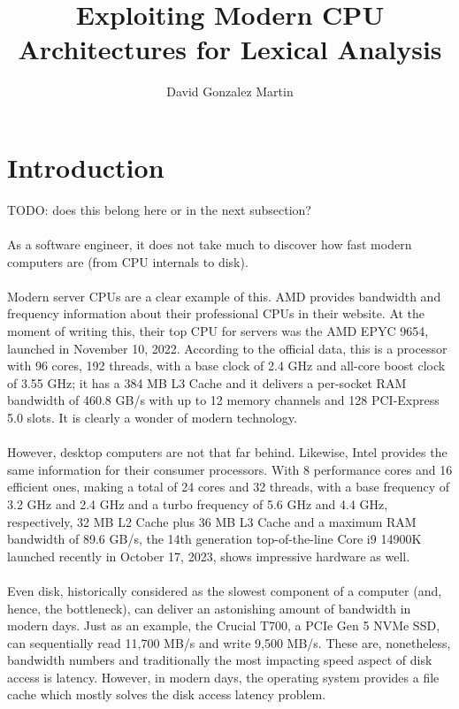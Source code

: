 \documentclass[12pt]{article}
\title{\vspace{-2.5cm}\textbf{Exploiting Modern CPU Architectures for Lexical Analysis}}
\author{David Gonzalez Martin}
\date{\vspace{-5ex}}
\begin{document}
	\maketitle{\vspace{-1.5cm}}
	\newpage
	\tableofcontents
	\newpage
	\section{Introduction}
	TODO: does this belong here or in the next subsection?
	
	\paragraph{}
	As a software engineer, it does not take much to discover how fast modern computers are (from CPU internals to disk).
	
	\paragraph{}
	Modern server CPUs are a clear example of this. AMD provides bandwidth and frequency information about their professional CPUs in their website. At the moment of writing this, their top CPU for servers was the AMD EPYC 9654\cite{epyc}, launched in November 10, 2022. According to the official data, this is a processor with 96 cores, 192 threads, with a base clock of 2.4 GHz and all-core boost clock of 3.55 GHz; it has a 384 MB L3 Cache and it delivers a per-socket RAM bandwidth of 460.8 GB/s with up to 12 memory channels and 128 PCI-Express 5.0 slots. It is clearly a wonder of modern technology.
	
	\paragraph{}
	However, desktop computers are not that far behind. Likewise, Intel provides the same information for their consumer processors. With 8 performance cores and 16 efficient ones, making a total of 24 cores and 32 threads, with a base frequency of 3.2 GHz and 2.4 GHz and a turbo frequency of 5.6 GHz and 4.4 GHz, respectively, 32 MB L2 Cache plus 36 MB L3 Cache and a maximum RAM bandwidth of 89.6 GB/s, the 14th generation top-of-the-line Core i9 14900K launched recently in October 17, 2023\cite{13900k}, shows impressive hardware as well.
	
	\paragraph{}
	Even disk, historically considered as the slowest component of a computer (and, hence, the bottleneck), can deliver an astonishing amount of bandwidth in modern days. Just as an example, the Crucial T700, a PCIe Gen 5 NVMe SSD, can sequentially read 11,700 MB/s and write 9,500 MB/s\cite{crucialt700}. These are, nonetheless, bandwidth numbers and traditionally the most impacting speed aspect of disk access is latency. However, in modern days, the operating system provides a file cache which mostly solves the disk access latency problem.
	
\end{document}
